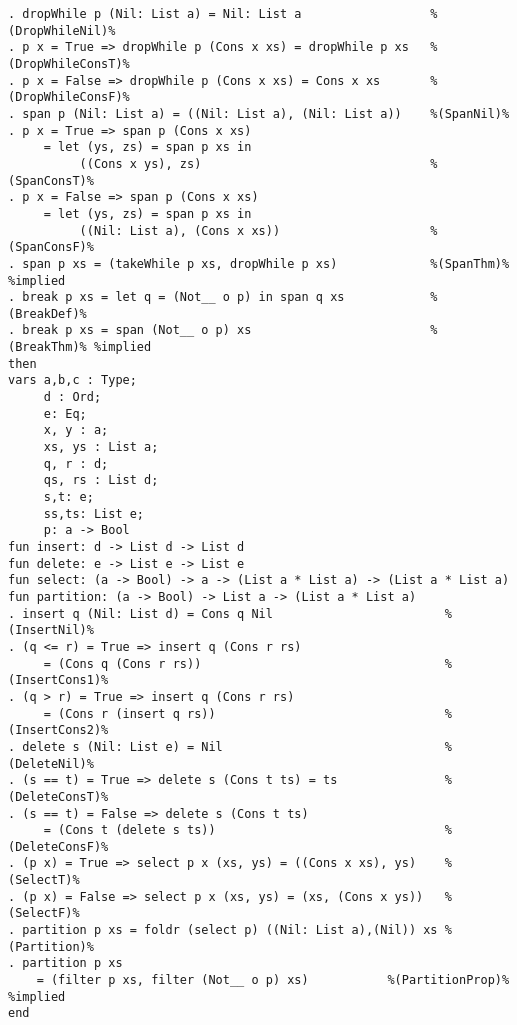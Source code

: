 \begin{Verbatim}
. dropWhile p (Nil: List a) = Nil: List a                  %(DropWhileNil)%
. p x = True => dropWhile p (Cons x xs) = dropWhile p xs   %(DropWhileConsT)%
. p x = False => dropWhile p (Cons x xs) = Cons x xs       %(DropWhileConsF)%
. span p (Nil: List a) = ((Nil: List a), (Nil: List a))    %(SpanNil)%
. p x = True => span p (Cons x xs) 
     = let (ys, zs) = span p xs in
          ((Cons x ys), zs)                                %(SpanConsT)%
. p x = False => span p (Cons x xs)
     = let (ys, zs) = span p xs in
          ((Nil: List a), (Cons x xs))                     %(SpanConsF)%
. span p xs = (takeWhile p xs, dropWhile p xs)             %(SpanThm)% %implied
. break p xs = let q = (Not__ o p) in span q xs            %(BreakDef)%
. break p xs = span (Not__ o p) xs                         %(BreakThm)% %implied
then
vars a,b,c : Type;
     d : Ord;
     e: Eq;
     x, y : a;
     xs, ys : List a;
     q, r : d;
     qs, rs : List d;
     s,t: e;
     ss,ts: List e;
     p: a -> Bool
fun insert: d -> List d -> List d
fun delete: e -> List e -> List e
fun select: (a -> Bool) -> a -> (List a * List a) -> (List a * List a)
fun partition: (a -> Bool) -> List a -> (List a * List a)
. insert q (Nil: List d) = Cons q Nil                        %(InsertNil)%
. (q <= r) = True => insert q (Cons r rs) 
     = (Cons q (Cons r rs))                                  %(InsertCons1)%
. (q > r) = True => insert q (Cons r rs) 
     = (Cons r (insert q rs))                                %(InsertCons2)%
. delete s (Nil: List e) = Nil                               %(DeleteNil)%
. (s == t) = True => delete s (Cons t ts) = ts               %(DeleteConsT)%
. (s == t) = False => delete s (Cons t ts) 
     = (Cons t (delete s ts))                                %(DeleteConsF)%
. (p x) = True => select p x (xs, ys) = ((Cons x xs), ys)    %(SelectT)%
. (p x) = False => select p x (xs, ys) = (xs, (Cons x ys))   %(SelectF)%
. partition p xs = foldr (select p) ((Nil: List a),(Nil)) xs %(Partition)%
. partition p xs 
    = (filter p xs, filter (Not__ o p) xs)           %(PartitionProp)% %implied
end
\end{Verbatim}

